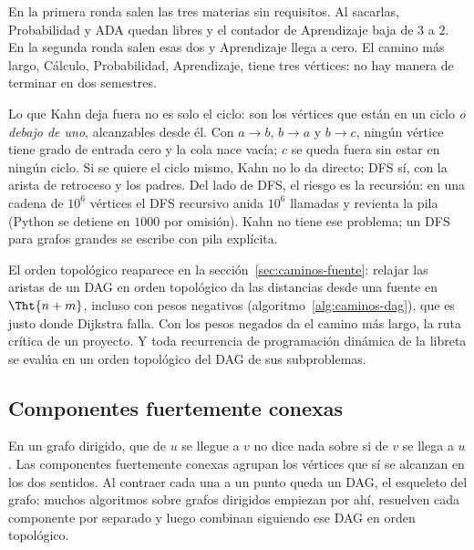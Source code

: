 \documentclass[11pt,letterpaper]{article}
\begin{document}
En la primera ronda salen las tres materias sin requisitos. Al
sacarlas, Probabilidad y ADA quedan libres y el contador de
Aprendizaje baja de $3$ a $2$. En la segunda ronda salen esas dos y
Aprendizaje llega a cero. El camino más largo, Cálculo, Probabilidad,
Aprendizaje, tiene tres vértices: no hay manera de terminar en dos
semestres.

\begin{ojo}
  Lo que Kahn deja fuera no es solo el ciclo: son los vértices que
  están en un ciclo \emph{o debajo de uno}, alcanzables desde él. Con
  $a \to b$, $b \to a$ y $b \to c$, ningún vértice tiene grado de
  entrada cero y la cola nace vacía; $c$ se queda fuera sin estar en
  ningún ciclo. Si se quiere el ciclo mismo, Kahn no lo da directo; DFS
  sí, con la arista de retroceso y los padres. Del lado de DFS, el
  riesgo es la recursión: en una cadena de $10^6$ vértices el DFS
  recursivo anida $10^6$ llamadas y revienta la pila (Python se detiene
  en $1000$ por omisión). Kahn no tiene ese problema; un DFS para
  grafos grandes se escribe con pila explícita.
\end{ojo}

\begin{observacion}
  El orden topológico reaparece en la sección~\ref{sec:caminos-fuente}:
  relajar las aristas de un DAG en orden topológico da las distancias
  desde una fuente en $\Tht{n + m}$, incluso con pesos negativos
  (algoritmo~\ref{alg:caminos-dag}), que es justo donde Dijkstra falla.
  Con los pesos negados da el camino más largo, la ruta crítica de un
  proyecto. Y toda recurrencia de programación dinámica de la libreta
  se evalúa en un orden topológico del DAG de sus subproblemas.
\end{observacion}


\subsection*{Componentes fuertemente conexas}

En un grafo dirigido, que de $u$ se llegue a $v$ no dice nada sobre si
de $v$ se llega a $u$. Las componentes fuertemente conexas agrupan los
vértices que sí se alcanzan en los dos sentidos. Al contraer cada una a
un punto queda un DAG, el esqueleto del grafo: muchos algoritmos sobre
grafos dirigidos empiezan por ahí, resuelven cada componente por
separado y luego combinan siguiendo ese DAG en orden topológico.
\end{document}
